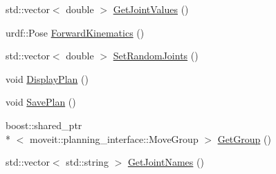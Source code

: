 \begin{DoxyCompactItemize}
\item 
std\-::vector$<$ double $>$ \hyperlink{classMoveitPlanning_a4ad173a662340daf91ab2ddde44e0946}{Get\-Joint\-Values} ()
\item 
urdf\-::\-Pose \hyperlink{classMoveitPlanning_a0417e420f1c97c887e5e4b70ebebdb57}{Forward\-Kinematics} ()
\item 
std\-::vector$<$ double $>$ \hyperlink{classMoveitPlanning_a8e98e6c54141fc0a3ef92cfcef7bcfa5}{Set\-Random\-Joints} ()
\item 
void \hyperlink{classMoveitPlanning_abe8bbc034b09c7935ee2a54d557fb5c8}{Display\-Plan} ()
\item 
void \hyperlink{classMoveitPlanning_a99ae8ab8c7047f95d114701f1f3f2a49}{Save\-Plan} ()
\item 
boost\-::shared\-\_\-ptr\\*
$<$ moveit\-::planning\-\_\-interface\-::\-Move\-Group $>$ \hyperlink{classMoveitPlanning_ae8754bf6b519a2fc6ada11a44989479b}{Get\-Group} ()
\item 
std\-::vector$<$ std\-::string $>$ \hyperlink{classMoveitPlanning_a26149b824c249979b28fcb46d4909668}{Get\-Joint\-Names} ()
\end{DoxyCompactItemize}
